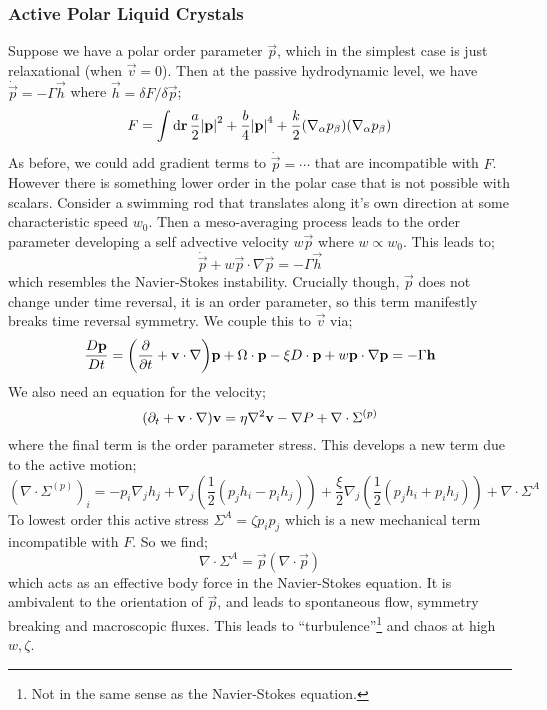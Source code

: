 \subsubsection{Active Polar Liquid Crystals}
Suppose we have a polar order parameter $\vec{p}$, which in the simplest case is just relaxational (when $\vec{v} = 0$). Then at the passive hydrodynamic level, we have $\dot{\vec{p}} = -\Gamma \vec{h}$ where $\vec{h} = \delta F/\delta \vec{p}$;
\begin{equation*}
F = \int{\upd{\vec{r}}\frac{a}{2}\abs{\vec{p}}^2 + \frac{b}{4}\abs{\vec{p}}^4 + \frac{k}{2}(\nabla_\alpha p_\beta)(\nabla_\alpha p_\beta)}
\end{equation*}
As before, we could add gradient terms to $\dot{\vec{p}} = \cdots$ that are incompatible with $F$. However there is something lower order in the polar case that is not possible with scalars. Consider a swimming rod that translates along it's own direction at some characteristic speed $w_0$. Then a meso-averaging process leads to the order parameter developing a self advective velocity $w\vec{p}$ where $w \propto w_0$. This leads to;
\begin{equation*}
\dot{\vec{p}} + w \vec{p}\cdot\nabla \vec{p} = -\Gamma \vec{h}
\end{equation*}
which resembles the Navier-Stokes instability. Crucially though, $\vec{p}$ does not change under time reversal, it is an order parameter, so this term manifestly breaks time reversal symmetry. We couple this to $\vec{v}$ via;
\begin{equation}
\frac{D\vec{p}}{Dt} = \left(\frac{\del}{\del t} + \vec{v}\cdot\nabla\right)\vec{p} + \Omega \cdot\vec{p} - \xi D\cdot\vec{p} + w\vec{p}\cdot\nabla \vec{p} = -\Gamma \vec{h}
\end{equation}
We also need an equation for the velocity;
\begin{equation}
(\partial_t + \mathbf{v}\cdot\nabla)\mathbf{v} = \eta \nabla^2 \mathbf{v} - \nabla P + \nabla\cdot\Sigma^{(p)}
\end{equation}
where the final term is the order parameter stress. This develops a new term due to the active motion;
\begin{equation*}
(\nabla \cdot \Sigma^{(p)})_i = -p_i \nabla_j h_j + \nabla_j\left(\frac{1}{2}(p_j h_i - p_i h_j)\right) + \frac{\xi}{2}\nabla_j\left(\frac{1}{2}(p_j h_i + p_i h_j)\right) + \nabla \cdot\Sigma^{A}
\end{equation*}
To lowest order this active stress $\Sigma^{A} = \zeta p_i p_j$ which is a new mechanical term incompatible with $F$. So we find;
\begin{equation}
\nabla \cdot\Sigma^{A} = \vec{p}(\nabla \cdot \vec{p})
\end{equation}
which acts as an effective body force in the Navier-Stokes equation. It is ambivalent to the orientation of $\vec{p}$, and leads to spontaneous flow, symmetry breaking and macroscopic fluxes. This leads to ``turbulence''\footnote{Not in the same sense as the Navier-Stokes equation.} and chaos at high $w, \zeta$.

